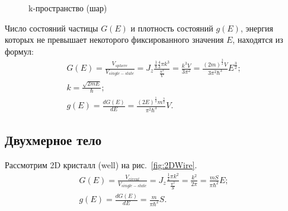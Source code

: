 \begin{figure}[h]
	\centering
	\caption{k-пространство (шар)}
	\label{fig:3DBulk}
\end{figure}

Число состояний частицы $G(E)$ и плотность состояний $g(E)$, энергия которых не превышает некоторого фиксированного значения $E$, находятся из формул:
\begin{gather*} 
	G(E) = \frac{V_{sphere}}{V_{single-state}} = J_{z}\frac{\frac{1}{8}\frac{4}{3}\pi k^{3}}{\frac{\pi^3}{V}} = \frac{k^{3}V}{3\pi^{2}} = \frac{(2m)^{\frac{3}{2}}V}{3\pi^{2}\hbar^{3}}E^{\frac{3}{2}};\\
	k = \frac{\sqrt{2mE}}{\hbar};\\
	g(E) = \frac{dG(E)}{dE} = \frac{(2E)^{\frac{1}{2}}m^{\frac{3}{2}}}{\pi^{2}\hbar^{3}}V.
\end{gather*}

\subsection{Двухмерное тело}
Рассмотрим 2D кристалл (well) на рис.~\ref{fig:2DWire}.
\begin{gather*} 
	G(E) = \frac{V_{circul}}{V_{single-state}} = J_{z}\frac{\frac{1}{4}\pi k^{2}}{\frac{\pi^2}{S}} = \frac{k^{2}}{2\pi} = \frac{mS}{\pi\hbar^{2}}E;\\
	g(E) = \frac{dG(E)}{dE} = \frac{m}{\pi\hbar^{2}}S.
\end{gather*}

